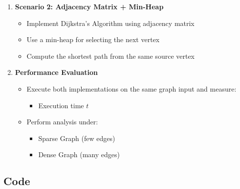 \documentclass[a4paper,12pt]{article}
\begin{document}
\begin{enumerate}
    \item \textbf{Scenario 2: Adjacency Matrix + Min-Heap}
    \begin{itemize}
        \item Implement Dijkstra's Algorithm using adjacency matrix
        \item Use a min-heap for selecting the next vertex
        \item Compute the shortest path from the same source vertex
    \end{itemize}
    \item \textbf{Performance Evaluation}
    \begin{itemize}
        \item Execute both implementations on the same graph input and measure:
        \begin{itemize}
            \item Execution time $t$
        \end{itemize}
        \item Perform analysis under:
        \begin{itemize}
            \item Sparse Graph (few edges)
            \item Dense Graph (many edges)
        \end{itemize}
    \end{itemize}
\end{enumerate}

\newpage
\subsection*{Code}


\newpage
\end{document}
